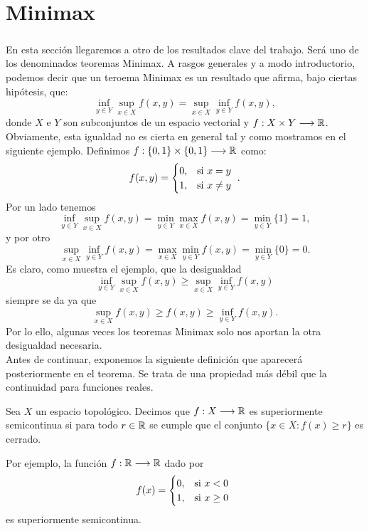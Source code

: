 \chapter{Minimax}
\newcommand{\topSpace}{X}
\newcommand{\topSpaceY}{Y}

\paragraph{}En esta sección llegaremos a otro de los resultados clave del trabajo. Será uno de los denominados teoremas Minimax. A rasgos generales y a modo introductorio, podemos decir que un teroema Minimax es un resultado que afirma, bajo ciertas hipótesis, que:
\[
\inf_{y \in Y} \sup_{x \in X} f(x,y) = \sup_{x \in X} \inf_{y \in Y} f(x,y),
\] 
donde $ X \text{ e } Y$ son subconjuntos de un espacio vectorial y $ f: X \times Y \longrightarrow \mathbb{R} $. Obviamente, esta igualdad no es cierta en general tal y como mostramos en el siguiente ejemplo. Definimos $ f:\{0,1\} \times \{0,1\} \longrightarrow \mathbb{R}$ como:
\[
f(x,y) = \begin{cases}
0, & \mbox{si $ x=y $ } \\
1, & \mbox{si $ x\neq y$ }
\end{cases}.
\]
Por un lado tenemos
\[
\inf_{ y \in Y}\sup_{x \in X} f(x,y) = \min_{ y \in Y}\max_{x \in X} f(x,y) = \min_{ y \in Y}\{1\} = 1,
\]
y por otro
\[
\sup_{x \in X} \inf_{ y \in Y}f(x,y) = \max_{x \in X}\min_{ y \in Y}f(x,y) = \min_{ y \in Y}\{0\} = 0.
\]
Es claro, como muestra el ejemplo, que la desigualdad 
\[
\inf_{y \in Y} \sup_{x \in X} f(x,y) \geq \sup_{x \in X} \inf_{y \in Y} f(x,y)
\] 
siempre se da ya que
\[
\sup_{x \in X} f(x,y) \geq f(x,y) \geq \inf_{y \in Y}f(x,y) .
\]
Por lo ello, algunas veces los teoremas Minimax solo nos aportan la otra desigualdad necesaria. \\

Antes de continuar, exponemos la siguiente definición que aparecerá posteriormente en el teorema. Se trata de una propiedad más débil que la continuidad para funciones reales. 
\begin{definicion}
Sea $ \topSpace $ un espacio topológico. Decimos que $ f:\topSpace \longrightarrow \RR $ es superiormente semicontinua si para todo $ r \in \mathbb{R} $ se cumple que el conjunto $ \lbrace x \in \topSpace : f(x) \geq r \rbrace $ es cerrado.
\end{definicion}

Por ejemplo, la función $ f:\mathbb{R} \longrightarrow \mathbb{R} $ dado por 
\[
f(x) = \begin{cases}
0, & \mbox{si $ x < 0 $ } \\
1, & \mbox{si $x \geq 0$ }
\end{cases}
\]
es superiormente semicontinua. \\

